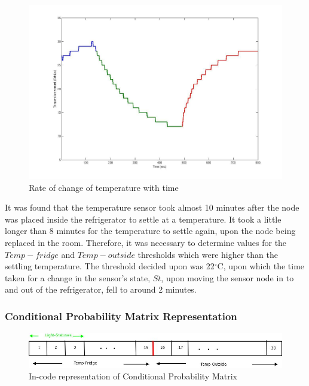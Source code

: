 \documentclass{sig-alternate-10pt}
\begin{document}
\begin{figure}[h]
\centering
\includegraphics[scale=0.2]{img/tempVsTime.jpg}
\caption{Rate of change of temperature with time} 
\label{Fig12:TempVsTime}
\end{figure}  


It was found that the temperature sensor took almost 10 minutes after the node was placed inside the refrigerator to settle at a temperature. It took a little longer than 8 minutes for the temperature to settle again, upon the node being replaced in the room. Therefore, it was necessary to determine values for the $Temp-fridge$ and $Temp-outside$ thresholds which were higher than the settling temperature. The threshold decided upon was 22$^\circ$C, upon which the time taken for a change in the sensor's state, $St$, upon moving the sensor node in to and out of the refrigerator, fell to around 2 minutes.

\subsubsection{Conditional Probability Matrix Representation} \label{subsubsec:CPMRep}

\begin{figure}[t]
\centering
\includegraphics[scale=0.2]{img/CondProbMatrixStruct.png}
\caption{In-code representation of Conditional Probability Matrix} 
\label{Fig9:CondProbMatrixStruct}
\end{figure} 
\end{document}
